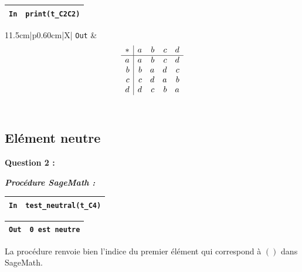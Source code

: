 \documentclass[titlepage]{article}
\begin{document}
        \begin{tabularx}{11.5cm}{|p{0.60cm}|X|}
            \hline
            \verb|In|
            & 
            \verb|print(t_C2C2)|
            \\
            \hline
        \end{tabularx}

        \begin{tabularx}{11.5cm}{|p{0.60cm}|X|}
            \hline
            \verb|Out|
            & 
            {\setlength{\arraycolsep}{2ex}
            \[\begin{array}{r|*{4}{r}}
                \multicolumn{1}{c|}{\ast}&a&b&c&d\\\hline
                {}a&a&b&c&d\\
                {}b&b&a&d&c\\
                {}c&c&d&a&b\\
                {}d&d&c&b&a\\
            \end{array}\]}
            \\
            \hline
        \end{tabularx}

        \pagebreak
        \subsection{Elément neutre}
        \textbf{Question 2 :}
        
        \emph{\textbf{Procédure SageMath :}}

        

        \begin{tabularx}{11.5cm}{|p{0.60cm}|X|}
            \hline
            \verb|In|
            & 
            \verb|test_neutral(t_C4)|
            \\
            \hline
        \end{tabularx}

        \begin{tabularx}{11.5cm}{|p{0.60cm}|X|}
            \hline
            \verb|Out|
            & 
            \verb|0 est neutre|
            \\
            \hline
        \end{tabularx} 
        \newline
        
        La procédure renvoie bien l'indice du premier élément qui correspond à $()$ dans SageMath.
        \newline
\end{document}
